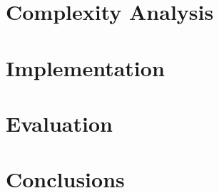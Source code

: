\documentclass[10pt,twocolumn,letterpaper]{article}
\begin{document}
\section{Complexity Analysis}

\section{Implementation}


\section{Evaluation}




\section{Conclusions}



{\small


}
\end{document}
